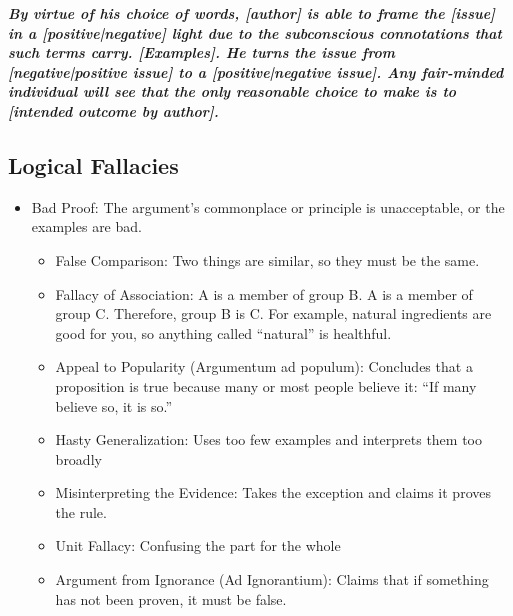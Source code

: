 \emph{\textbf{By virtue of his choice of words, [author] is able to frame the [issue] in a [positive|negative] light due to the subconscious connotations that such terms carry. [Examples]. He turns the issue from [negative|positive issue] to a [positive|negative issue]. Any fair-minded individual will see that the only reasonable choice to make is to [intended outcome by author].}}

\subsection{Logical Fallacies}

\begin{itemize}
	\item Bad Proof: The argument's commonplace or principle is unacceptable, or the examples are bad.
	\begin{itemize}
			\item False Comparison: Two things are similar, so they must be the same.
			\item Fallacy of Association: A is a member of group B. A is a member of group C. Therefore, group B is C. For example, natural ingredients are good for you, so anything called ``natural'' is healthful.
			\item Appeal to Popularity (Argumentum ad populum): Concludes that a proposition is true because many or most people believe it: ``If many believe so, it is so.''
			\item Hasty Generalization: Uses too few examples and interprets them too broadly
			\item Misinterpreting the Evidence: Takes the exception and claims it proves the rule.
			\item Unit Fallacy: Confusing the part for the whole
			\item Argument from Ignorance (Ad Ignorantium): Claims that if something has not been proven, it must be false.	
	\end{itemize}


\end{itemize}
